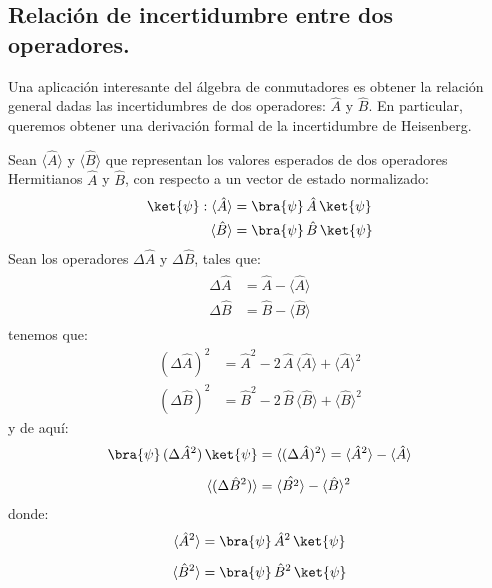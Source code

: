 \subsection{Relación de incertidumbre entre dos operadores.}

Una aplicación interesante del álgebra de conmutadores es obtener la relación general dadas las incertidumbres de dos operadores: $\hat{A}$ y $\hat{B}$. En particular, queremos obtener una derivación formal de la incertidumbre de Heisenberg.
\par
Sean $\langle \hat{A} \rangle$ y $ \langle \hat{B} \rangle$ que representan los valores esperados de dos operadores Hermitianos $\hat{A}$ y $\hat{B}$, con respecto a un vector de estado normalizado: 
\begin{align*}
\ket{\psi}: \langle \hat{A} \rangle &= \bra{\psi} \, \hat{A} \, \ket{\psi} \\
\langle \hat{B} \rangle &= \bra{\psi} \, \hat{B} \, \ket{\psi}
\end{align*}
Sean los operadores $\Delta \hat{A}$ y $\Delta \hat{B}$, tales que:
\begin{align}
\begin{aligned}
\Delta \hat{A} &= \hat{A} - \langle \hat{A} \rangle \\
\Delta \hat{B} &= \hat{B} - \langle \hat{B} \rangle
\end{aligned}
\label{eq:ecuacion_02_95}
\end{align}
tenemos que:
\begin{align*}
(\Delta \hat{A})^{2} &= \hat{A}^{2} - 2 \, \hat{A} \, \langle \hat{A} \rangle + \langle \hat{A} \rangle^{2} \\
(\Delta \hat{B})^{2} &= \hat{B}^{2} - 2 \, \hat{B} \, \langle \hat{B} \rangle + \langle \hat{B} \rangle^{2}
\end{align*}
y de aquí:
\begin{align}
\begin{aligned}
\bra{\psi} \, (\Delta \hat{A}^{2}) \, \ket{\psi} &= \langle (\Delta \hat{A})^{2} \rangle = \langle \hat{A}^{2} \rangle - \langle \hat{A} \rangle \\[0.5em]
\langle (\Delta \hat{B}^{2}) \rangle &= \langle \hat{B^{2}} \rangle - \langle \hat{B} \rangle^{2}
\end{aligned}
\label{eq:ecuacion_02_96}
\end{align}
donde:
\begin{align*}
\langle \hat{A}^{2} \rangle &= \bra{\psi} \, \hat{A}^{2} \, \ket{\psi} \\[0.5em]
\langle \hat{B}^{2} \rangle &= \bra{\psi} \, \hat{B}^{2} \, \ket{\psi}
\end{align*}
